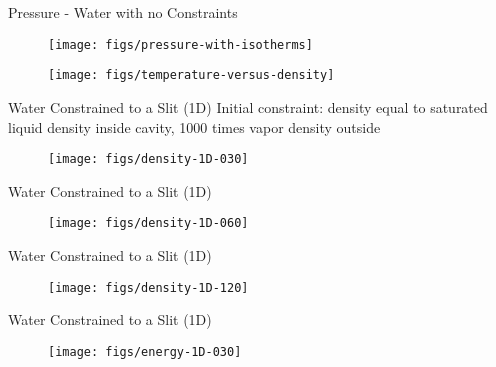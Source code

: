 \documentclass{beamer}
\begin{document}
\begin{frame}[fragile]{Pressure - Water with no Constraints}
\begin{figure}
\begin{center}
\texttt{[image: figs/pressure-with-isotherms]}
\end{center}
\end{figure} 
\end{frame}

\begin{frame}
\begin{figure}
\begin{center}
\texttt{[image: figs/temperature-versus-density]}
\end{center}
\end{figure}
\end{frame}

\begin{frame}[fragile]{Water Constrained to a Slit (1D)}
Initial constraint: density equal to saturated liquid density inside cavity, 1000 times vapor density outside
\begin{figure}
\begin{center}
\texttt{[image: figs/density-1D-030]}
\end{center}
\end{figure} 
\end{frame}

\begin{frame}[fragile]{Water Constrained to a Slit (1D)}
\begin{figure}
\begin{center}
\texttt{[image: figs/density-1D-060]}
\end{center}
\end{figure} 
\end{frame}

\begin{frame}[fragile]{Water Constrained to a Slit (1D)}
\begin{figure}
\begin{center}
\texttt{[image: figs/density-1D-120]}
\end{center}
\end{figure} 
\end{frame}

\begin{frame}[fragile]{Water Constrained to a Slit (1D)}
\begin{figure}
\begin{center}
\texttt{[image: figs/energy-1D-030]}
\end{center}
\end{figure} 
\end{frame}
\end{document}
